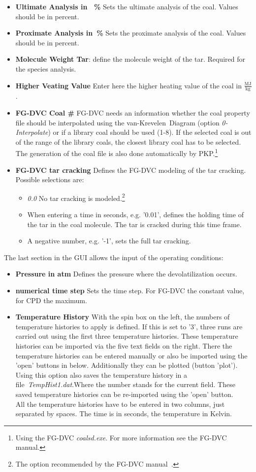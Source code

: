 \begin{itemize}
 \item \textbf{Ultimate Analysis in ~\%} Sets the ultimate analysis of the coal. Values should be in percent.
 \item \textbf{Proximate Analysis in~\%} Sets the proximate analysis of the coal. Values should be in percent.
 \item \textbf{Molecule Weight Tar}: define the molecule weight of the tar. Required for the species analysis.
 \item \textbf{Higher Veating Value} Enter here the higher heating value of the coal in $\mathrm{\frac{MJ}{kg}}$.
 \item \textbf{FG-DVC Coal \#} FG-DVC needs an information whether the coal property file should be interpolated using the van-Krevelen~Diagram (option \emph{0-Interpolate}) or if a library coal should be used (1-8). If the selected coal is out of the range of the library coals, the closest library coal has to be selected. The generation of the coal file is also done automatically by PKP.\footnote{Using the FG-DVC \emph{coalsd.exe}. For more information see the FG-DVC manual.}
 \item \textbf{FG-DVC tar cracking} Defines the FG-DVC modeling of the tar cracking. Possible selections are:
 \begin{itemize}
  \item \emph{0.0} No tar cracking is modeled.\footnote{The option recommended by the FG-DVC manual~\cite{FGDVC_822}.}
  \item When entering a time in seconds, e.g. '0.01', defines the holding time of the tar in the coal molecule. The tar is cracked during this time frame.
  \item A negative number, e.g. '-1', sets the full tar cracking.
 \end{itemize}
\end{itemize}

The last section in the GUI allows the input of the operating conditions:
\begin{itemize}
 \item \textbf{Pressure in atm} Defines the pressure where the devolatilization occurs.
 \item \textbf{numerical time step} Sets the time step. For FG-DVC the constant value, for CPD the maximum.
 \item \textbf{Temperature History} With the spin box on the left, the numbers of temperature histories to apply is defined. If this is set to '3', three runs are carried out using the first three temperature histories. These temperature histories can be imported via the five text fields on the right. There the temperature histories can be entered manually or also be imported using the 'open' buttons in below. Additionally they can be plotted (button 'plot'). Using this option also saves the temperature history in a file~\emph{TempHist1.dat}.Where the number stands for the current field. These saved temperature histories can be re-imported using the 'open' button.\\
 All the temperature histories have to be entered in two columns, just separated by spaces. The time is in seconds, the temperature in Kelvin.
\end{itemize}

